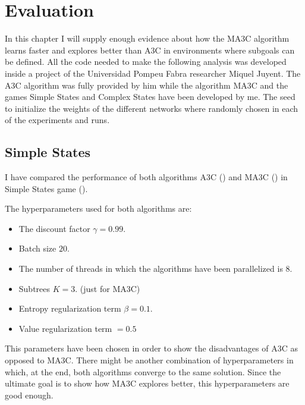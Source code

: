 \chapter{Evaluation}

In this chapter I will supply enough evidence about how the \ac{MA3C} algorithm learns faster and explores better than
\ac{A3C} in environments where subgoals can be defined.
All the code needed to make the following analysis was developed inside a project of the Universidad Pompeu Fabra researcher
Miquel Juyent.
The \ac{A3C} algorithm was fully provided by him while the algorithm \ac{MA3C} and the games Simple States and Complex
States have been developed by me.
The seed to initialize the weights of the different networks where randomly chosen in each of the experiments and runs.

\section{Simple States}

I have compared the performance of both algorithms \ac{A3C} () and \ac{MA3C} () in Simple
States game ().

The hyperparameters used for both algorithms are:
\begin{itemize} %
    \item The discount factor $\gamma = 0.99$.
    \item Batch size $20$. %
    \item The number of threads in which the algorithms have been parallelized is $8$.
    \item Subtrees $K = 3$. (just for \ac{MA3C})
    \item Entropy regularization term $\beta = 0.1$.
    \item Value regularization term $ = 0.5$ %
\end{itemize}

This parameters have been chosen in order to show the disadvantages of \ac{A3C} as opposed to \ac{MA3C}.
There might be another combination of hyperparameters in which, at the end, both algorithms converge to the same solution.
Since the ultimate goal is to show how \ac{MA3C} explores better, this hyperparameters are good enough.

